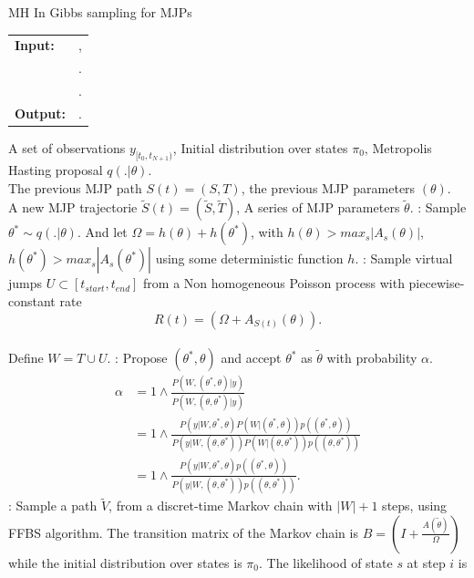 \begin{algorithm}[H]
   \caption{MH In Gibbs sampling for MJPs }
   \label{alg:MH In Gibbs}
\begin{algorithmic}
  \State
  \begin{tabular}{l l}
   \textbf{Input:  } & \text{A set of partial and noisy observations $y_{[t_0, t_{N+1})}$}, \\
                      & \text{Initial distribution over states $\pi_0$,  Metropolis Hasting proposal $q(. | \theta)$}.\\
                      & \text{The previous MJP path $S(t) = (S, T)$, the previous MJP parameters $\theta$}.\\ 
   \textbf{Output:  }& \text{A new MJP trajectory $\tilde{S} (t) = (\tilde{S}, \tilde{T})$, A series of MJP parameters $\tilde{\theta}$}.
   \end{tabular}
    A set of observations $y_{[t_0, t_{N+1})}$, 
   Initial distribution over states $\pi_0$,  Metropolis Hasting proposal $q(. | \theta)$.\\
   The previous MJP path $S(t) = (S, T)$, the previous MJP parameters $(\theta)$.\\  
       A new MJP trajectorie $\tilde{S} (t) = (\tilde{S}, \tilde{T})$, A series of MJP parameters $\tilde{\theta}$.
      :  Sample $\theta^* \sim q(.| \theta)$. And let $\Omega = h(\theta) + h(\theta^*)$, with $h(\theta) > max_s{|A_s(\theta)|}$, $h(\theta^*) > max_s{|A_s(\theta^*)|}$ using some deterministic function $h$.
    : Sample virtual jumps $U\subset[t_{start}, t_{end}]$ from a Non homogeneous Poisson process with piecewise-constant rate$$R(t) = (\Omega + A_{S(t)}(\theta)).$$\\Define $W = T \cup U$.
    : Propose $(\theta^*, \theta)$ and accept $\theta^*$ as $\tilde{\theta}$ with probability $\alpha$.
        \begin{align*}
        \alpha &=  1 \wedge \frac{P(W,(\theta^*, \theta)| y)}{P(W, (\theta, \theta^*)| y)}\\
        &=  1 \wedge \frac{P(y| W,\theta^*, \theta) P(W | (\theta^*, \theta))p((\theta^*, \theta))}{P(y| W,(\theta, \theta^*)) P(W | (\theta, \theta^*))p((\theta, \theta^*))}\\
                &=  1 \wedge \frac{P(y| W,\theta^*, \theta)p((\theta^*, \theta))}{P(y| W,(\theta, \theta^*))p((\theta, \theta^*))}.
        \end{align*}
    : Sample a path $\tilde{V}$, from a discret-time Markov chain with $|W| + 1$ steps, using FFBS algorithm. The transition matrix of the Markov chain is $B = (I + \frac{A(\tilde{\theta})}{\Omega})$ while the initial distribution over states is $\pi_0$. The likelihood of state $s$ at step $i$ is 

\end{algorithmic}
\end{algorithm}
